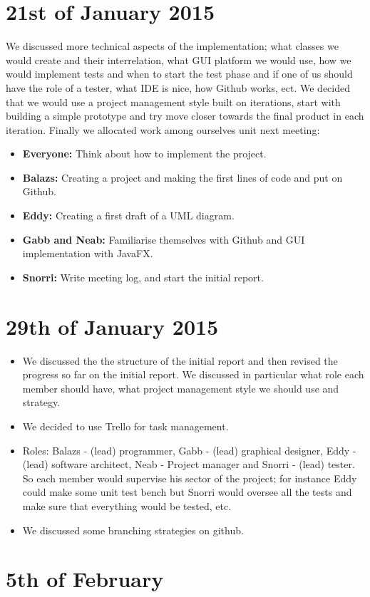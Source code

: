 \documentclass[11pt]{article}
\begin{document}
\section{21st of January 2015}
We discussed more technical aspects of the implementation; what classes we would create and their interrelation, what GUI platform we would use, how we would implement tests and when to start the test phase and if one of us should have the role of a tester, what IDE is nice, how Github works, ect. We decided that we would use a project management style built on iterations, start with building a simple prototype and try move closer towards the final product in each iteration. Finally we allocated work among ourselves unit next meeting:
\begin{itemize}
\item \textbf{Everyone:} Think about how to implement the project.

\item \textbf{Balazs:} Creating a project and making the first lines of code and put on Github.

\item \textbf{Eddy:} Creating a first draft of a UML diagram.

\item \textbf{Gabb and Neab:} Familiarise themselves with Github and GUI implementation with JavaFX.

\item \textbf{Snorri:} Write meeting log, and start the initial report.

\end{itemize} 

\newpage

\section{29th of January 2015}
\begin{itemize}
\item We discussed the the structure of the initial report and then revised the progress so far on the initial report. We discussed in particular what role each member should have, what project management style we should use and strategy.
\item We decided to use Trello for task management.
\item Roles: Balazs - (lead) programmer, Gabb - (lead) graphical designer, Eddy - (lead) software architect, Neab - Project manager and Snorri - (lead) tester. So each member would supervise his sector of the project; for instance Eddy could make some unit test bench but Snorri would oversee all the tests and make sure that everything would be tested, etc.
\item We discussed some branching strategies on github. 
\end{itemize} 

\newpage

\section{5th of February}


\newpage
\end{document}
